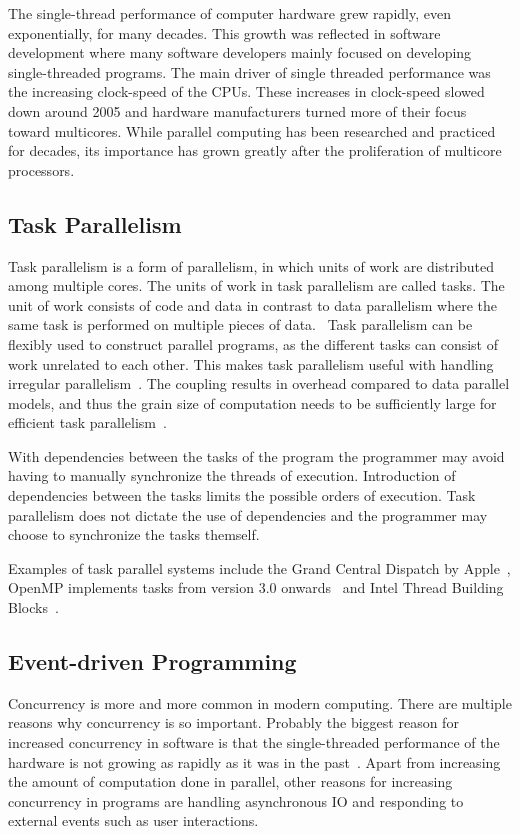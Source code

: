 The single-thread performance of computer hardware grew rapidly, even exponentially, for many decades. This growth was reflected in software development where many software developers mainly focused on developing single-threaded programs. The main driver of single threaded performance was the increasing clock-speed of the CPUs. These increases in clock-speed slowed down around 2005 and hardware manufacturers turned more of their focus toward multicores. While parallel computing has been researched and practiced for decades, its importance has grown greatly after the proliferation of multicore processors.~\cite{sutter2005free}


\subsection{Task Parallelism}
\label{subsec:task-parallelism}
Task parallelism is a form of parallelism, in which units of work are distributed among multiple cores. The units of work in task parallelism are called tasks. The unit of work consists of code and data in contrast to data parallelism where the same task is performed on multiple pieces of data.~\cite{hennessy2011computer} Task parallelism can be flexibly used to construct parallel programs, as the different tasks can consist of work unrelated to each other. This makes task parallelism useful with handling irregular parallelism~\cite{ayguade2009design}. The coupling results in overhead compared to data parallel models, and thus the grain size of computation needs to be sufficiently large for efficient task parallelism~\cite{subhlok1993exploiting}.

With dependencies between the tasks of the program the programmer may avoid having to manually synchronize the threads of execution. Introduction of dependencies between the tasks limits the possible orders of execution. Task parallelism does not dictate the use of dependencies and the programmer may choose to synchronize the tasks themself.~\cite{hennessy2011computer}

Examples of task parallel systems include the Grand Central Dispatch by Apple~\cite{sakamoto2012grand}, OpenMP implements tasks from version 3.0 onwards~\cite{ayguade2009design} and Intel Thread Building Blocks~\cite{pheatt2008intel}.

\subsection{Event-driven Programming}
\label{subsec:event-driven-programming}
Concurrency is more and more common in modern computing. There are multiple reasons why concurrency is so important. Probably the biggest reason for increased concurrency in software is that the single-threaded performance of the hardware is not growing as rapidly as it was in the past~\cite{sutter2005free}. Apart from increasing the amount of computation done in parallel, other reasons for increasing concurrency in programs are handling asynchronous IO and responding to external events such as user interactions.

